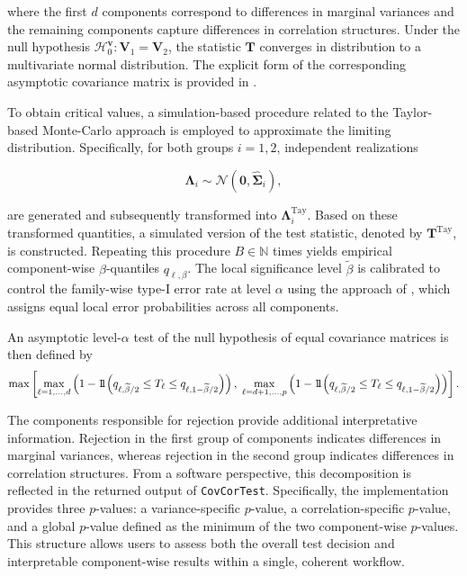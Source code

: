 where the first \(d\) components correspond to differences in marginal variances and the remaining components capture differences in correlation structures. Under the null hypothesis \(\mathcal{H}_0^{\boldsymbol{v}}:\boldsymbol{V}_1=\boldsymbol{V}_2\), the statistic \(\boldsymbol{T}\) converges in distribution to a multivariate normal distribution. The explicit form of the corresponding asymptotic covariance matrix is provided in \citet{sattler2023}.

To obtain critical values, a simulation-based procedure related to the Taylor-based Monte-Carlo approach is employed to approximate the limiting distribution. Specifically, for both groups \(i=1,2\), independent realizations

\begin{equation}
\boldsymbol{\Lambda}_i
\sim
\mathcal{N}(\mathbf{0},\widehat{\boldsymbol{\Sigma}}_i),
\label{eq:combined-simulation}
\end{equation}

are generated and subsequently transformed into \(\boldsymbol{\Lambda}_i^{\mathrm{Tay}}\). Based on these transformed quantities, a simulated version of the test statistic, denoted by \(\boldsymbol{T}^{\mathrm{Tay}}\), is constructed. Repeating this procedure \(B \in \mathbb{N}\) times yields empirical component-wise \(\beta\)-quantiles \(q_{\ell,\beta}\). The local significance level \(\widetilde{\beta}\) is calibrated to control the family-wise type-I error rate at level \(\alpha\) using the approach of \citet{munko2024}, which assigns equal local error probabilities across all components.

An asymptotic level-\(\alpha\) test of the null hypothesis of equal covariance matrices is then defined by
\begin{equation}
\max\left[
\max_{\ell=1,\dots,d}
\left(
1-1\hspace{-0.7ex}1\!\left(
q_{\ell,\widetilde{\beta}/2}
\leq T_\ell \leq
q_{\ell,1-\widetilde{\beta}/2}
\right)
\right),
\;
\max_{\ell=d+1,\dots,p}
\left(
1-1\hspace{-0.7ex}1\!\left(
q_{\ell,\widetilde{\beta}/2}
\leq T_\ell \leq
q_{\ell,1-\widetilde{\beta}/2}
\right)
\right)
\right].
\label{eq:combined-test}
\end{equation}

The components responsible for rejection provide additional interpretative information. Rejection in the first group of components indicates differences in marginal variances, whereas rejection in the second group indicates differences in correlation structures. From a software perspective, this decomposition is reflected in the returned output of \texttt{CovCorTest}. Specifically, the implementation provides three \(p\)-values: a variance-specific \(p\)-value, a correlation-specific \(p\)-value, and a global \(p\)-value defined as the minimum of the two component-wise \(p\)-values. This structure allows users to assess both the overall test decision and interpretable component-wise results within a single, coherent workflow.

